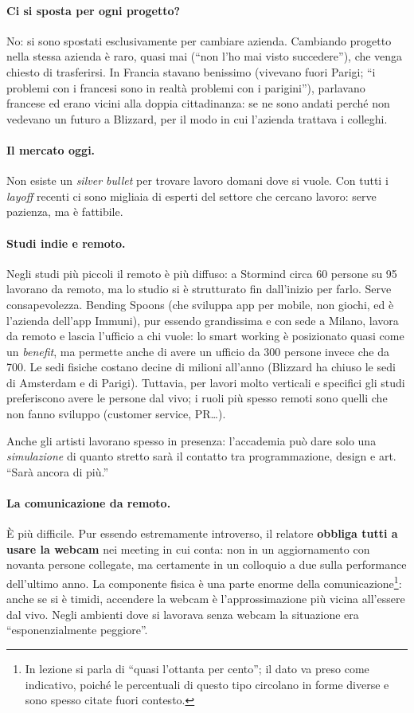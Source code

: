 \paragraph{Ci si sposta per ogni progetto?} No: si sono spostati
esclusivamente per cambiare azienda. Cambiando progetto nella stessa azienda
è raro, quasi mai (``non l'ho mai visto succedere''), che venga chiesto di
trasferirsi. In Francia stavano benissimo (vivevano fuori Parigi; ``i
problemi con i francesi sono in realtà problemi con i parigini''), parlavano
francese ed erano vicini alla doppia cittadinanza: se ne sono andati perché
non vedevano un futuro a Blizzard, per il modo in cui l'azienda trattava i
colleghi.

\paragraph{Il mercato oggi.} Non esiste un \emph{silver bullet} per trovare
lavoro domani dove si vuole. Con tutti i \emph{layoff} recenti ci sono
migliaia di esperti del settore che cercano lavoro: serve pazienza, ma è
fattibile.

\paragraph{Studi indie e remoto.} Negli studi più piccoli il remoto è più
diffuso: a Stormind circa 60 persone su 95 lavorano da remoto, ma lo studio
si è strutturato fin dall'inizio per farlo. Serve consapevolezza. Bending
Spoons (che sviluppa app per mobile, non giochi, ed è l'azienda dell'app
Immuni), pur essendo grandissima e con sede a Milano, lavora da remoto e
lascia l'ufficio a chi vuole: lo smart working è posizionato quasi come un
\emph{benefit}, ma permette anche di avere un ufficio da 300 persone invece
che da 700. Le sedi fisiche costano decine di milioni all'anno (Blizzard ha
chiuso le sedi di Amsterdam e di Parigi). Tuttavia, per lavori molto
verticali e specifici gli studi preferiscono avere le persone dal vivo; i
ruoli più spesso remoti sono quelli che non fanno sviluppo (customer service,
PR\dots).

Anche gli artisti lavorano spesso in presenza: l'accademia può dare solo una
\emph{simulazione} di quanto stretto sarà il contatto tra programmazione,
design e art. ``Sarà ancora di più.''

\paragraph{La comunicazione da remoto.} È più difficile. Pur essendo
estremamente introverso, il relatore \textbf{obbliga tutti a usare la webcam}
nei meeting in cui conta: non in un aggiornamento con novanta persone
collegate, ma certamente in un colloquio a due sulla performance dell'ultimo
anno. La componente fisica è una parte enorme della
comunicazione\footnote{In lezione si parla di ``quasi l'ottanta per cento'';
il dato va preso come indicativo, poiché le percentuali di questo tipo
circolano in forme diverse e sono spesso citate fuori contesto.}: anche se si
è timidi, accendere la webcam è l'approssimazione più vicina all'essere dal
vivo. Negli ambienti dove si lavorava senza webcam la situazione era
``esponenzialmente peggiore''.

